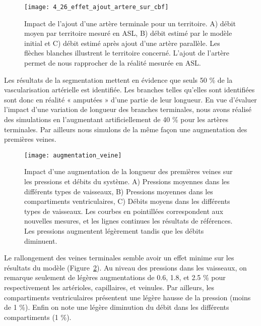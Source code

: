 \begin{figure}[!t]
\centering
\texttt{[image: 4\_26\_effet\_ajout\_artere\_sur\_cbf]}
\caption{Impact de l'ajout d'une artère terminale pour un territoire. A) débit moyen par territoire mesuré en ASL, B) débit estimé par le modèle initial et C) débit estimé après ajout d'une artère parallèle. Les flèches blanches illustrent le territoire concerné. L'ajout de l'artère permet de nous rapprocher de la réalité mesurée en ASL.}
\label{fig:4_26_effet_ajout_artere_sur_cbf}	
\end{figure}

Les résultats de la segmentation mettent en évidence que seuls 50 \% de la vascularisation artérielle est identifiée. Les branches telles qu’elles sont identifiées sont donc en réalité « amputées » d’une partie de leur longueur. En vue d’évaluer l’impact d’une variation de longueur des branches terminales, nous avons réalisé des simulations en l’augmentant artificiellement de 40 \% pour les artères terminales. Par ailleurs nous simulons de la même façon une augmentation des premières veines. 

\begin{figure}[!t]
\centering
\texttt{[image: augmentation\_veine]}
\caption{Impact d’une augmentation de la longueur des premières veines sur les pressions et débits du système. A) Pressions moyennes dans les différents types de vaisseaux, B) Pressions moyennes dans les compartiments ventriculaires, C) Débits moyens dans les différents types de vaisseaux. Les courbes en pointillées correspondent aux nouvelles mesures, et les lignes continues les résultats de références. Les pressions augmentent légèrement tandis que les débits diminuent.}
\label{fig:augmentation_veine}	
\end{figure}

Le rallongement des veines terminales semble avoir un effet minime sur les résultats du modèle (Figure~\ref{fig:augmentation_veine}). Au niveau des pressions dans les vaisseaux, on remarque seulement de légères augmentations de 0.6, 1.8, et 2.5 \% pour respectivement les artérioles, capillaires, et veinules.  Par ailleurs, les compartiments ventriculaires présentent une légère hausse de la pression (moins de 1 \%). Enfin on note une légère diminution du débit dans les différents compartiments (1 \%).

